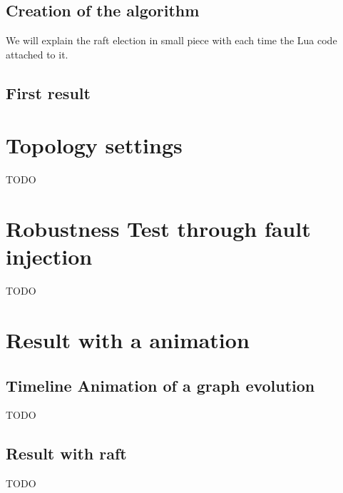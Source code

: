\documentclass{eplmastersthesis}
\begin{document}
        \subsection{Creation of the algorithm}
        We will explain the raft election in small piece with each time the Lua code attached to it.


        \subsection{First result}

      \section{Topology settings}

      {\color{red} TODO}

      \section{Robustness Test through fault injection}


      {\color{red} TODO}

      \section{Result with a animation}

        \subsection{Timeline Animation of a graph evolution}
          {\color{red} TODO}

        \subsection{Result with raft}
          {\color{red} TODO}
    
\end{document}
